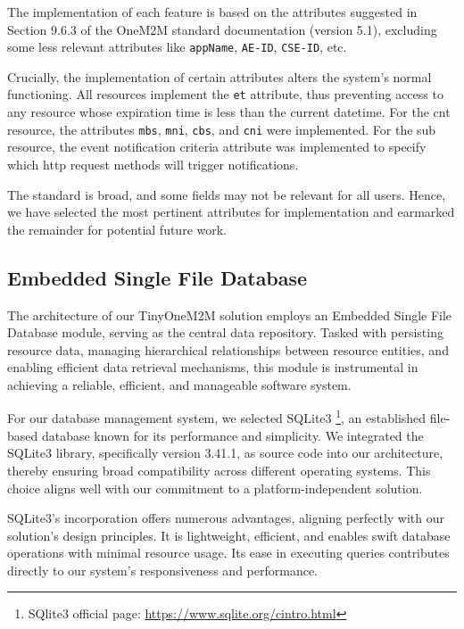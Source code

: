 \documentclass[a4paper,fleqn]{cas-dc}
\begin{document}
The implementation of each feature is based on the attributes suggested in Section 9.6.3 of the OneM2M standard documentation (version 5.1), excluding some less relevant attributes like \texttt{appName}, \texttt{AE-ID}, \texttt{CSE-ID}, etc.

Crucially, the implementation of certain attributes alters the system's normal functioning. All resources implement the \texttt{et} attribute, thus preventing access to any resource whose expiration time is less than the current datetime. For the \gls{cnt} resource, the attributes \texttt{mbs}, \texttt{mni}, \texttt{cbs}, and \texttt{cni} were implemented. For the \gls{sub} resource, the event notification criteria attribute was implemented to specify which \gls{http} request methods will trigger notifications.

The standard is broad, and some fields may not be relevant for all users. Hence, we have selected the most pertinent attributes for implementation and earmarked the remainder for potential future work.

\subsection{Embedded Single File Database}

The architecture of our TinyOneM2M solution employs an Embedded Single File Database module, serving as the central data repository. Tasked with persisting resource data, managing hierarchical relationships between resource entities, and enabling efficient data retrieval mechanisms, this module is instrumental in achieving a reliable, efficient, and manageable software system.

For our database management system, we selected SQLite3 \footnote{SQlite3 official page: \url{https://www.sqlite.org/cintro.html}}, an established file-based database known for its performance and simplicity. We integrated the SQLite3 library, specifically version 3.41.1, as source code into our architecture, thereby ensuring broad compatibility across different operating systems. This choice aligns well with our commitment to a platform-independent solution.

SQLite3's incorporation offers numerous advantages, aligning perfectly with our solution's design principles. It is light\-weight, efficient, and enables swift database operations with minimal resource usage. Its ease in executing queries contributes directly to our system's responsiveness and performance.
\end{document}
